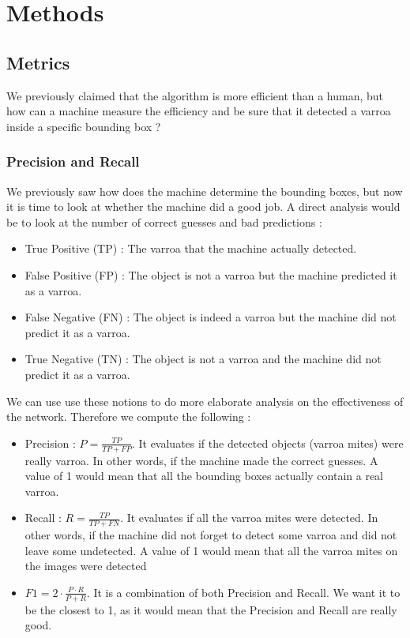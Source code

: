 \documentclass{article}
\begin{document}
\newpage
\section{Methods}

\subsection{Metrics}

We previously claimed that the algorithm is more efficient than a human, but how can a machine measure the efficiency and be sure that it detected a varroa inside a specific bounding box ? 



\subsubsection{Precision and Recall}
\label{Section 3.1.1}

We previously saw how does the machine determine the bounding boxes, but now it is time to look at whether the machine did a good job. A direct analysis would be to look at the number of correct guesses and bad predictions : 

\begin{itemize}
  \item True Positive (TP) : The varroa that the machine actually detected.
  \item False Positive (FP) : The object is not a varroa but the machine predicted it as a varroa.
  \item False Negative (FN) : The object is indeed a varroa but the machine did not predict it as a varroa.
  \item True Negative (TN) : The object is not a varroa and the machine did not predict it as a varroa.
\end{itemize}

We can use use these notions to do more elaborate analysis on the effectiveness of the network. Therefore we compute the following :


\begin{itemize}
  \item Precision : $P = \frac{TP}{TP + FP}$. It evaluates if the detected objects (varroa mites) were really varroa. In other words, if the machine made the correct guesses. A value of 1 would mean that all the bounding boxes actually contain a real varroa.
  \item Recall : $R = \frac{TP}{TP + FN}$. It evaluates if all the varroa mites were detected. In other words, if the machine did not forget to detect some varroa and did not leave some undetected. A value of 1 would mean that all the varroa mites on the images were detected
  \item $F1 = 2 \cdot \frac{P \cdot R}{P + R}$. It is a combination of both Precision and Recall. We want it to be the closest to 1, as it would mean that the Precision and Recall are really good.
\end{itemize}
\end{document}
